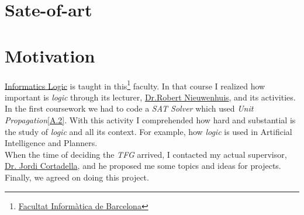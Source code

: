 \section{Sate-of-art}


\section{Motivation}

\href{https://www.fib.upc.edu/en/studies/bachelors-degrees/bachelor-degree-informatics-engineering/curriculum/syllabus/LI}{Informatics Logic} is taught in this\footnote{\href{https://www.fib.upc.edu/en/}{Facultat Informàtica de Barcelona}} faculty. In that course I realized how important is \emph{logic} through its lecturer, \href{http://www.lsi.upc.es/~roberto/}{Dr.Robert Nieuwenhuis}, and its activities. \\

In the first coursework we had to code a \emph{SAT Solver} which used \emph{Unit Propagation}\ref{A.2}. With this activity I comprehended how hard and substantial is the study of \emph{logic} and all its context. For example, how \emph{logic} is used in Artificial Intelligence and Planners.\\

When the time of deciding the \emph{TFG} arrived, I contacted my actual supervisor, \href{https://www.cs.upc.edu/~jordicf/}{Dr. Jordi Cortadella}, and he proposed me some topics and ideas for projects. Finally, we agreed on doing this project. 
